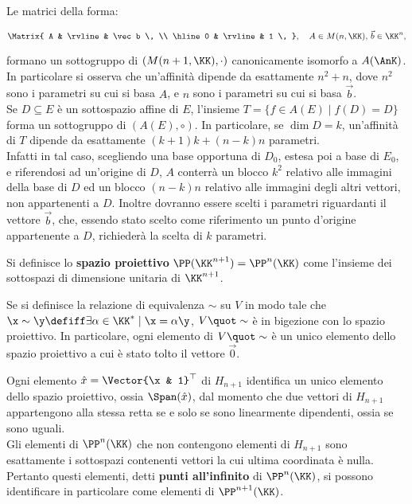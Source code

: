 \documentclass[11pt]{article}
\begin{document}
	\begin{remark}
		Le matrici della forma:
		
		\[ \Matrix{ A & \rvline & \vec b \, \\ \hline 0 & \rvline & 1 \, }, \quad A \in M(n, \KK), \, \vec b \in \KK^n, \]
		
		\vskip 0.05in
		
		formano un sottogruppo di $(M(n+1, \KK), \cdot)$ canonicamente isomorfo a $A(\AnK)$. In particolare si osserva che un'affinità dipende
		da esattamente $n^2 + n$, dove $n^2$ sono i parametri su cui
		si basa $A$, e $n$ sono i parametri su cui si basa $\vec b$. \\
		
		Se $D \subseteq E$ è un sottospazio affine di $E$, l'insieme
		$T = \{ f \in A(E) \mid f(D) = D \}$ forma un sottogruppo di $(A(E), \circ)$. In particolare, se $\dim D = k$, un'affinità di $T$
		dipende da esattamente $(k+1)k + (n-k)n$ parametri. \\
		
		Infatti in tal caso, scegliendo una base opportuna di $D_0$, estesa
		poi a base di $E_0$, e riferendosi ad un'origine di $D$,
		$A$ conterrà un blocco $k^2$ relativo alle immagini della base
		di $D$ ed un blocco $(n-k)n$ relativo alle immagini degli altri
		vettori, non appartenenti a $D$. Inoltre dovranno essere scelti
		i parametri riguardanti il vettore $\vec b$, che, essendo stato
		scelto come riferimento un punto d'origine appartenente a $D$,
		richiederà la scelta di $k$ parametri.
	\end{remark}
	
	\hr
	
	\begin{definition} 
		Si definisce lo \textbf{spazio proiettivo} $\PP(\KK^{n+1}) = \PP^n(\KK)$ come l'insieme
		dei sottospazi di dimensione unitaria di $\KK^{n+1}$.
	\end{definition}
	
	\begin{remark}
		Se si definisce la relazione di equivalenza $\sim$ su $V$ in modo tale che $\x \sim \y \defiff \exists \alpha \in \KK^* \mid \x = \alpha \y$, $V \quot \sim$ è in bigezione con lo spazio proiettivo. In particolare,
		ogni elemento di $V \quot \sim$ è un unico elemento dello spazio proiettivo a cui è stato tolto il vettore $\vec 0$.
	\end{remark}
	
	\begin{remark}
		Ogni elemento $\hat x = \Vector{\x & 1}^\top$ di $H_{n+1}$ identifica un unico elemento dello spazio proiettivo, ossia $\Span(\hat x)$, dal momento che due vettori di $H_{n+1}$ appartengono alla stessa retta se e solo se
		sono linearmente dipendenti, ossia se sono uguali. \\
		
		Gli elementi di $\PP^n(\KK)$ che non contengono elementi di $H_{n+1}$ sono esattamente i sottospazi
		contenenti vettori la cui ultima coordinata è nulla. Pertanto questi elementi, detti \textbf{punti all'infinito}
		di $\PP^n(\KK)$, si possono identificare in particolare come elementi di $\PP^{n+1}(\KK)$. \\
	\end{remark}
	
\end{document}
